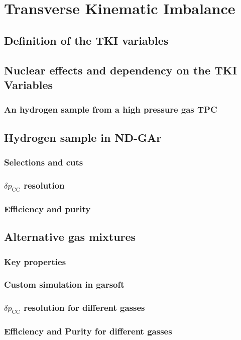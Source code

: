 \begin{savequote}[8cm]
\end{savequote}

\chapter{\label{ch:6-TKI}Transverse Kinematic Imbalance}


\minitoc
\section{Definition of the TKI variables}
\section{Nuclear effects and dependency on the TKI Variables}
\subsection{An hydrogen sample from a high pressure gas TPC}
\section{Hydrogen sample in ND-GAr}
\subsection{Selections and cuts}
\subsection{$\delta p_\textrm{CC}$ resolution}
\subsection{Efficiency and purity}
\section{Alternative gas mixtures}
\subsection{Key properties}
\subsection{Custom simulation in garsoft}
\subsection{$\delta p_\textrm{CC}$ resolution for different gasses}
\subsection{Efficiency and Purity for different gasses}